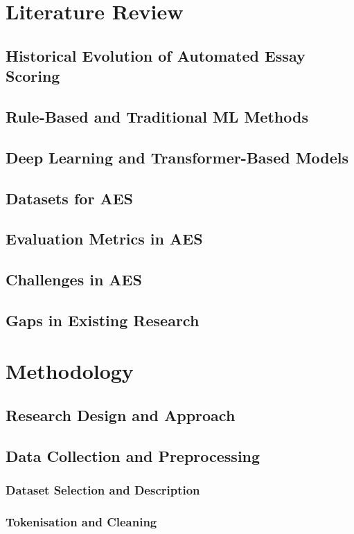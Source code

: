 \documentclass[12pt]{report}
\begin{document}
\chapter{Literature Review}
\section{Historical Evolution of Automated Essay Scoring}
\section{Rule-Based and Traditional ML Methods}
\section{Deep Learning and Transformer-Based Models}
\section{Datasets for AES}
\section{Evaluation Metrics in AES}
\section{Challenges in AES}
\section{Gaps in Existing Research}

\chapter{Methodology}
\section{Research Design and Approach}
\section{Data Collection and Preprocessing}
\subsection{Dataset Selection and Description}
\subsection{Tokenisation and Cleaning}
\end{document}
